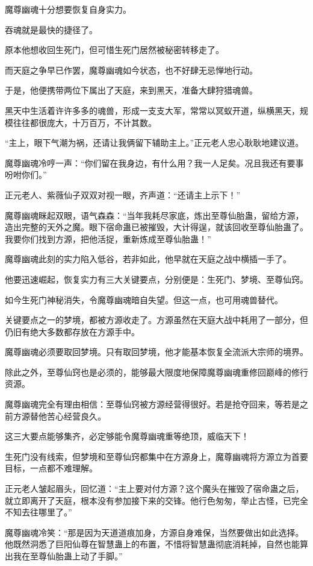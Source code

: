 \begin{this_body}
魔尊幽魂十分想要恢复自身实力。

吞魂就是最快的捷径了。

原本他想收回生死门，但可惜生死门居然被秘密转移走了。

而天庭之争早已作罢，魔尊幽魂如今状态，也不好肆无忌惮地行动。

于是，他便携带两位下属出了天庭，来到黑天，准备大肆狩猎魂兽。

黑天中生活着许许多多的魂兽，形成一支支大军，常常以冥蚁开道，纵横黑天，规模往往都很庞大，十万百万，不计其数。

“主上，眼下气潮为祸，还请让我俩留下辅助主上。”正元老人忠心耿耿地建议道。

魔尊幽魂冷哼一声：“你们留在我身边，有什么用？我一人足矣。况且我还有要事吩咐你们。”

正元老人、紫薇仙子双双对视一眼，齐声道：“还请主上示下！”

魔尊幽魂眯起双眼，语气森森：“当年我耗尽家底，炼出至尊仙胎蛊，留给方源，造出完整的天外之魔。眼下宿命蛊已被摧毁，大计得逞，就该回收至尊仙胎蛊了。我要你们找到方源，把他活捉，重新炼成至尊仙胎蛊！”

魔尊幽魂此刻的实力陷入低谷，若非如此，他早就在天庭之战中横插一手了。

他要迅速崛起，恢复实力有三大关键要点，分别便是：生死门、梦境、至尊仙窍。

如今生死门神秘消失，令魔尊幽魂暗自失望。但这一点，也可用魂兽替代。

关键要点之一的梦境，都被方源收走了。方源虽然在天庭大战中耗用了一部分，但仍旧有绝大多数都存放在方源手中。

魔尊幽魂必须要取回梦境。只有取回梦境，他才能基本恢复全流派大宗师的境界。

除此之外，至尊仙窍也是必须的，能够最大限度地保障魔尊幽魂重修回巅峰的修行资源。

魔尊幽魂完全有理由相信：至尊仙窍被方源经营得很好。若是抢夺回来，等若是之前方源替他苦心经营良久。

这三大要点能够集齐，必定够能令魔尊幽魂重等绝顶，威临天下！

生死门没有线索，但梦境和至尊仙窍都集中在方源身上，魔尊幽魂将方源立为首要目标，一点都不难理解。

正元老人皱起眉头，回忆道：“主上要对付方源？这个魔头在摧毁了宿命蛊之后，就立即离开了天庭，根本没有参加接下来的交锋。他行色匆匆，举止古怪，已完全不知去往哪里了。”

魔尊幽魂冷笑：“那是因为天道道痕加身，方源自身难保，当然要做出如此选择。他既然洞悉了巨阳仙尊在智慧蛊上的布置，不惜将智慧蛊彻底消耗掉，自然也能算出我在至尊仙胎蛊上动了手脚。”


\end{this_body}
